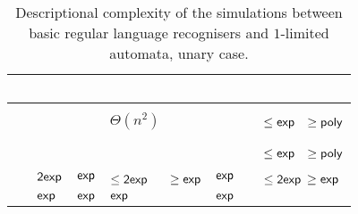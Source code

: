 \begin{table}
	\centering
	\renewcommand{\arraystretch}{1.2}
	\renewcommand{\hstdef}{.55}
	\begin{tabular}{|l|l|l|p{4.3em}|l|l|p{3.1em}|}
		\hline
		~     & \ODFA           & \ONFA           & \TDFA                                            & \TNFA   & \OLA   & \ODLA                          \\ \hline
		\ODFA & \cY             & \Ctriv          & \Ctriv                                           & \Ctriv  & \Ctriv & \Ctriv                         \\ \hline
		\ONFA & \rbt{$\CsubEq$} & \cY             & \cR $\Theta(n^2)$                                & \Ctriv  & \Ctriv & \cB $\le\Cexp\hst$ $\ge\Cpoly$ \\ \hline
		\TDFA & \rbt{$\CsubEq$} & \rbt{$\CsubEq$} & \cY                                              & \Ctriv  & \Ctriv & \Ctriv                         \\ \hline
		\TNFA & \rbt{$\CsubEq$} & \rbt{$\CsubEq$} & \cR \rbt[.4]{$\le\Csubln$} \rbt[.3]{$\ge\Cpoly$} & \cY     & \Ctriv & \cB $\le\Cexp\hst$ $\ge\Cpoly$ \\ \hline
		\OLA  & $\Cdexp$        & $\Cexp$         & \cG $\le\Cdexp\hst[1.25]$ $\ge\Cexp$             & $\Cexp$ & \cY    & \cG $\le\Cdexp$ $\ge\Cexp$     \\ \hline
		\ODLA & $\Cexp$         & $\Cexp$         & $\Cexp$                                          & $\Cexp$ & \Ctriv & \cY                            \\ \hline
	\end{tabular}
	\caption{Descriptional complexity of the simulations between basic regular language recognisers and $1$-limited automata, unary case.}
	\label{tab:sims-1la-unary}
\end{table}

